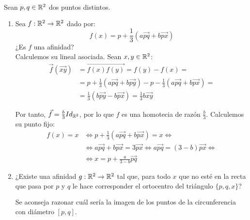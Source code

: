 \documentclass[12pt]{article}
\begin{document}
    
    \begin{ejercicio}
        Sean $p, q\in \mathbb{R}^2$ dos puntos distintos.
        \begin{enumerate}
            \item Sea $f:\mathbb{R}^2\to \mathbb{R}^2$ dado por:
            \begin{equation*}
                f(x) = p+\frac{1}{3}\left(a\vec{pq} +b \vec{px}\right)
            \end{equation*}
            ¿Es $f$ una afinidad?\\

            Calculemos su lineal asociada. Sean $x,y\in \mathbb{R}^2$:
            \begin{align*}
                \vec{f}\left(\vec{xy}\right)
                &= \vec{f(x)f(y)} = f(y) - f(x) =\\
                &= p+\frac{1}{3}\left(a\vec{pq} +b \vec{py}\right) - p-\frac{1}{3}\left(a\vec{pq} +b \vec{px}\right) =\\
                &= \frac{1}{3}\left(b\vec{py} - b\vec{px}\right) = \frac{1}{3}b\vec{xy}
            \end{align*}

            Por tanto, $\vec{f} = \frac{b}{3}Id_{\mathbb{R}^2}$, por lo que $f$ es una homotecia de razón $\frac{b}{3}$.
            Calculemos su punto fijo:
            \begin{align*}
                f(x) = x& \Longleftrightarrow p+\frac{1}{3}\left(a\vec{pq} +b \vec{px}\right) = x \Longleftrightarrow\\
               & \Longleftrightarrow a\vec{pq} +b \vec{px} = 3\vec{px}
               \Longleftrightarrow a\vec{pq} = (3-b)\vec{px} \Longleftrightarrow\\
                & \Longleftrightarrow x = p + \frac{a}{3-b}\vec{pq}
            \end{align*}

            \item ¿Existe una afinidad $g:\mathbb{R}^2\to \mathbb{R}^2$ tal que, para todo $x$ que no esté en la recta
            que pasa por $p$ y $q$ le hace corresponder el ortocentro del triángulo $\{p,q,x\}$?
            \begin{observacion}
                Se aconseja razonar cuál sería la imagen de los puntos de la circunferencia con diámetro $[p,q]$.
            \end{observacion}
        \end{enumerate}
    \end{ejercicio}
\end{document}

